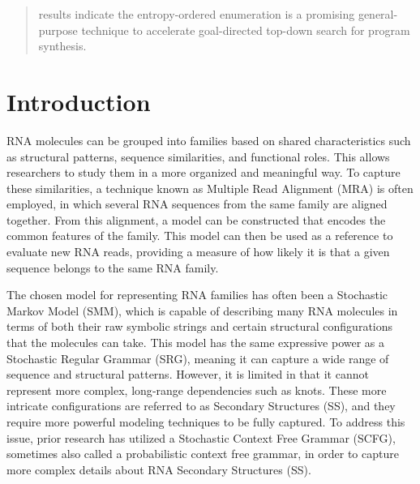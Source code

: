 \documentclass[10pt,conference,peerreview]{IEEEtran}
\begin{document}
\IEEEpeerreviewmaketitle

\begin{abstract}
 results indicate the entropy-ordered enumeration is a promising general-purpose technique to accelerate goal-directed top-down search for program synthesis.
\end{abstract}  

\section{Introduction}
\label{sec:intro}


\newcommand{\mra}{Multiple Read Alignment}
\newcommand{\mraabbv}{MRA}
\newcommand{\smm}{Stochastic Markov Model}
\newcommand{\smmabbv}{SMM}
\newcommand{\srg}{Stochastic Regular Grammar}
\newcommand{\srgabbv}{SRG}
\newcommand{\sss}{Secondary Structures}
\newcommand{\sssabbv}{SS}
\newcommand{\scfg}{Stochastic Context Free Grammar}
\newcommand{\scfgabbv}{SCFG}
\newcommand{\rnaf}{RNA families}
\newcommand{\ged}{Grammatical Edit Distance}
\newcommand{\gedabbv}{GED}


RNA molecules can be grouped into families based on shared characteristics such as structural patterns, sequence similarities, and functional roles. This allows researchers to study them in a more organized and meaningful way.  
To capture these similarities, a technique known as \mra{} (\mraabbv{}) is often employed, in which several RNA sequences from the same family are aligned together.  
From this alignment, a model can be constructed that encodes the common features of the family. This model can then be used as a reference to evaluate new RNA reads, providing a measure of how likely it is that a given sequence belongs to the same RNA family.  

The chosen model for representing RNA families has often been a \smm{} (\smmabbv{}), which is capable of describing many RNA molecules in terms of both their raw symbolic strings and certain structural configurations that the molecules can take.  
This model has the same expressive power as a \srg{} (\srgabbv{}), meaning it can capture a wide range of sequence and structural patterns.  
However, it is limited in that it cannot represent more complex, long‑range dependencies such as knots.  
These more intricate configurations are referred to as \sss{} (\sssabbv{}), and they require more powerful modeling techniques to be fully captured.  
To address this issue, prior research has utilized a \scfg{} (\scfgabbv{}), sometimes also called a probabilistic context free grammar, in order to capture more complex details about RNA \sss{} (\sssabbv{}).  
\end{document}
